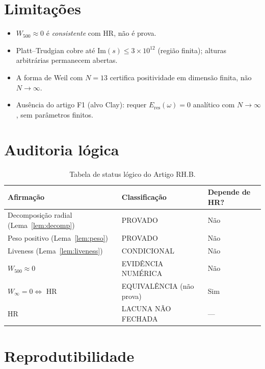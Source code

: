 \documentclass[12pt,a4paper]{article}
\theoremstyle{definition}
\begin{document}
\section{Limitações}\label{sec:limitacoes}

\begin{itemize}
  \item $W_{500} \approx 0$ é \emph{consistente} com HR, não é prova.
  \item Platt--Trudgian cobre até $\mathrm{Im}(s) \le 3 \times 10^{12}$
        (região finita); alturas arbitrárias permanecem abertas.
  \item A forma de Weil com $N=13$ certifica positividade em dimensão
        finita, não $N \to \infty$.
  \item Ausência do artigo F1 (alvo Clay): requer $E_{\mathrm{res}}(\omega) = 0$
        analítico com $N \to \infty$, sem parâmetros finitos.
\end{itemize}

\section{Auditoria lógica}\label{sec:auditoria}

\begin{table}[h]
\centering
\small
\begin{tabular}{lll}
\toprule
Afirmação & Classificação & Depende de HR? \\
\midrule
Decomposição radial (Lema~\ref{lem:decomp}) & PROVADO & Não \\
Peso positivo (Lema~\ref{lem:peso})         & PROVADO & Não \\
Liveness (Lema~\ref{lem:liveness})          & CONDICIONAL & Não \\
$W_{500} \approx 0$                         & EVIDÊNCIA NUMÉRICA & Não \\
$W_\infty = 0 \Leftrightarrow$ HR           & EQUIVALÊNCIA (não prova) & Sim \\
HR                                          & LACUNA NÃO FECHADA & — \\
\bottomrule
\end{tabular}
\caption{Tabela de status lógico do Artigo RH.B.}
\end{table}

\section{Reprodutibilidade}\label{sec:reproducibilidade}
\end{document}
